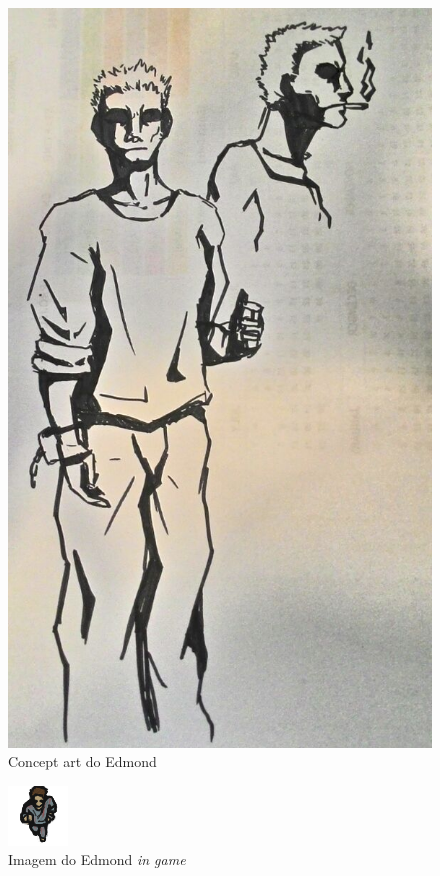 \begin{figure}[h]
    \centering
    \caption{Concept art do Edmond}
     \includegraphics[keepaspectratio=true,scale=0.30]{images/Prev_Ed.png}
\end{figure}

\begin{figure}[h]
    \centering
    \caption{Imagem do Edmond \textit{in game}}
     \includegraphics[keepaspectratio=true,scale=4]{images/e_ig.png}
\end{figure}
